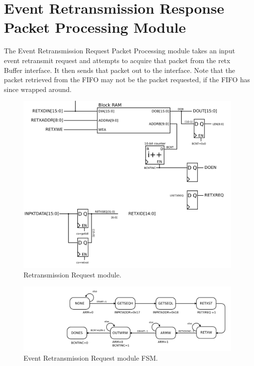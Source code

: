 \section{Event Retransmission Response Packet Processing Module} 

The Event Retransmission Request Packet Processing module takes an
input event retransmit request and attempts to acquire that packet
from the retx Buffer interface. It then sends that packet out to the
interface. Note that the packet retrieved from the FIFO may not be the
packet requested, if the FIFO has since wrapped around.

\begin{figure}
\begin{centering}
\includegraphics[scale=0.8]{eventretxresponse.svg}
\end{centering}
\caption{Retransmission Request module.}
\label{eventretxresponse}
\end{figure}

\begin{figure}
\begin{centering}
\includegraphics[scale=0.8]{eventretxresponse.fsm.svg}
\end{centering}
\caption{Event Retransmission Request module FSM.}
\label{eventretxresponse.fsm}
\end{figure}
